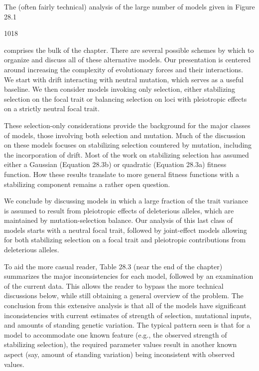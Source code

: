 \documentclass{article}
\begin{document}
The (often fairly technical) analysis of the large number of models given in Figure 28.1

1018

comprises the bulk of the chapter. There are several possible schemes by which to organize and discuss all of these alternative models. Our presentation is centered around increasing the complexity of evolutionary forces and their interactions. We start with drift interacting with neutral mutation, which serves as a useful baseline. We then consider models invoking only selection, either stabilizing selection on the focal trait or balancing selection on loci with pleiotropic effects on a strictly neutral focal trait.

These selection-only considerations provide the background for the major classes of models, those involving both selection and mutation. Much of the discussion on these models focuses on stabilizing selection countered by mutation, including the incorporation of drift. Most of the work on stabilizing selection has assumed either a Gaussian (Equation 28.3b) or quadratic (Equation 28.3a) fitness function. How these results translate to more general fitness functions with a stabilizing component remains a rather open question.

We conclude by discussing models in which a large fraction of the trait variance is assumed to result from pleiotropic effects of deleterious alleles, which are maintained by mutation-selection balance. Our analysis of this last class of models starts with a neutral focal trait, followed by joint-effect models allowing for both stabilizing selection on a focal trait and pleiotropic contributions from deleterious alleles.

To aid the more casual reader, Table 28.3 (near the end of the chapter) summarizes the major inconsistencies for each model, followed by an examination of the current data. This allows the reader to bypass the more technical discussions below, while still obtaining a general overview of the problem. The conclusion from this extensive analysis is that all of the models have significant inconsistencies with current estimates of strength of selection, mutational inputs, and amounts of standing genetic variation. The typical pattern seen is that for a model to accommodate one known feature (e.g., the observed strength of stabilizing selection), the required parameter values result in another known aspect (say, amount of standing variation) being inconsistent with observed values.
\end{document}
